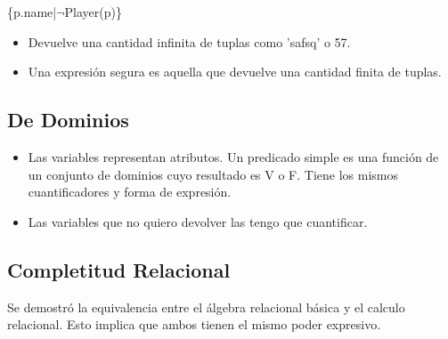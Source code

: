 \begin{center}
    \{p.name|$\neg$Player(p)\}
\end{center}

\begin{itemize}
\item Devuelve una cantidad infinita de tuplas como 'safsq' o 57.
\item Una expresión segura es aquella que devuelve una cantidad finita de tuplas.
\end{itemize}


\subsection*{De Dominios}
\begin{itemize}
\item Las variables representan atributos. Un predicado simple es una función de un conjunto de dominios cuyo resultado es V o F. Tiene los mismos cuantificadores y forma de expresión. 
\item Las variables que no quiero devolver las tengo que cuantificar.
\end{itemize}


\subsection*{Completitud Relacional}
Se demostró la equivalencia entre el álgebra relacional básica y el calculo relacional. Esto implica que ambos tienen el mismo poder expresivo.


\newpage